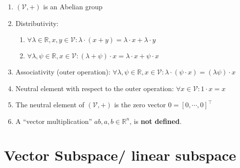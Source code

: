 \begin{enumerate}
    \item $(\mathcal{V}, +)$ is an Abelian group

    \item Distributivity:
    \begin{enumerate}
        \item $\forall \lambda  \in  \mathbb{R}, x, y \in  \mathcal{V} : \lambda  \cdot  (x + y) = \lambda  \cdot  x + \lambda  \cdot  y$

        \item $\forall \lambda , \psi  \in  \mathbb{R}, x \in  \mathcal{V} : (\lambda  + \psi ) \cdot  x = \lambda  \cdot  x + \psi  \cdot  x$
    \end{enumerate}

    \item Associativity (outer operation): $\forall \lambda , \psi  \in  \mathbb{R}, x \in  \mathcal{V} : \lambda \cdot (\psi \cdot x) = (\lambda \psi )\cdot x$

    \item Neutral element with respect to the outer operation: $\forall x \in  \mathcal{V} : 1\cdot x = x$

    \item The neutral element of $(\mathcal{V}, +)$ is the zero vector $0 = [0, \cdots , 0]^\top$

    \item A “vector multiplication” $ab, a, b \in \mathbb{R}^n$, is \textbf{not defined}.
\end{enumerate}








\section{Vector Subspace/ linear subspace}


